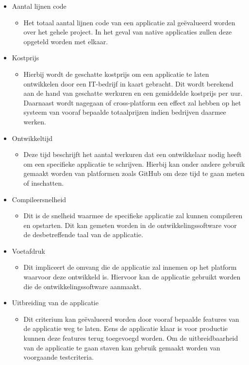 \begin{itemize}
    \item Aantal lijnen code
    \begin{itemize}
        \item Het totaal aantal lijnen code van een applicatie zal geëvalueerd worden over het gehele project. In het geval van native applicaties zullen deze opgeteld worden met elkaar.
    \end{itemize}
    \item Kostprijs
    \begin{itemize}
        \item Hierbij wordt de geschatte kostprijs om een applicatie te laten ontwikkelen door een IT-bedrijf in kaart gebracht. Dit wordt berekend aan de hand van geschatte werkuren en een gemiddelde kostprijs per uur. Daarnaast wordt nagegaan of cross-platform een effect zal hebben op het systeem van vooraf bepaalde totaalprijzen indien bedrijven daarmee werken.
    \end{itemize}
    \item Ontwikkeltijd
    \begin{itemize}
        \item Deze tijd beschrijft het aantal werkuren dat een ontwikkelaar nodig heeft om een specifieke applicatie te schrijven. Hierbij kan onder andere gebruik gemaakt worden van platformen zoals GitHub om deze tijd te gaan meten of inschatten.
    \end{itemize}
    \item Compileersnelheid
    \begin{itemize}
        \item Dit is de snelheid waarmee de specifieke applicatie zal kunnen compileren en opstarten. Dit kan gemeten worden in de ontwikkelingssoftware voor de desbetreffende taal van de applicatie.
    \end{itemize}
    \item Voetafdruk
    \begin{itemize}
        \item Dit impliceert de omvang die de applicatie zal innemen op het platform waarvoor deze ontwikkeld is. Hiervoor kan de applicatie gebruikt worden die de ontwikkelingssoftware aanmaakt.
    \end{itemize}
    \item Uitbreiding van de applicatie
    \begin{itemize}
        \item Dit criterium kan geëvalueerd worden door vooraf bepaalde features van de applicatie weg te laten. Eens de applicatie klaar is voor productie kunnen deze features terug toegevoegd worden. Om de uitbreidbaarheid van de applicatie te gaan staven kan gebruik gemaakt worden van voorgaande testcriteria.
    \end{itemize}
\end{itemize}

